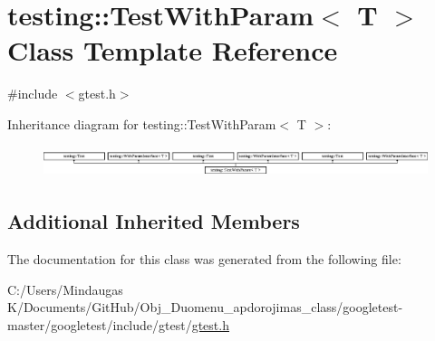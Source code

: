\hypertarget{classtesting_1_1_test_with_param}{}\section{testing\+::Test\+With\+Param$<$ T $>$ Class Template Reference}
\label{classtesting_1_1_test_with_param}


{\ttfamily \#include $<$gtest.\+h$>$}

Inheritance diagram for testing\+::Test\+With\+Param$<$ T $>$\+:\begin{figure}[H]
\begin{center}
\leavevmode
\includegraphics[height=0.919540cm]{dc/df9/classtesting_1_1_test_with_param}
\end{center}
\end{figure}
\subsection*{Additional Inherited Members}


The documentation for this class was generated from the following file\+:\begin{DoxyCompactItemize}
\item 
C\+:/\+Users/\+Mindaugas K/\+Documents/\+Git\+Hub/\+Obj\+\_\+\+Duomenu\+\_\+apdorojimas\+\_\+class/googletest-\/master/googletest/include/gtest/\mbox{\hyperlink{googletest-master_2googletest_2include_2gtest_2gtest_8h}{gtest.\+h}}\end{DoxyCompactItemize}
